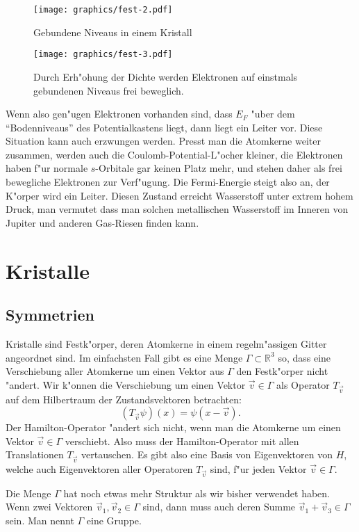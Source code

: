 \begin{figure}
\centering
\texttt{[image: graphics/fest-2.pdf]}
\caption{Gebundene Niveaus in einem Kristall
\label{skript:gebundene-niveaus}}
\end{figure}
\begin{figure}
\centering
\texttt{[image: graphics/fest-3.pdf]}
\caption{Durch Erh"ohung der Dichte werden Elektronen auf einstmals
gebundenen Niveaus frei beweglich.
\label{skript:gebundene-niveaus}}
\end{figure}
Wenn also gen"ugen Elektronen vorhanden sind, dass $E_F$ "uber dem
``Bodenniveaus'' des Potentialkastens liegt, dann liegt ein Leiter vor.
Diese Situation kann auch erzwungen werden.
Presst man die Atomkerne weiter zusammen, werden auch die
Coulomb-Potential-L"ocher kleiner, die Elektronen haben f"ur normale
$s$-Orbitale gar keinen Platz mehr, und stehen daher als frei bewegliche
Elektronen zur Verf"ugung.
Die Fermi-Energie steigt also an, der K"orper wird ein Leiter.
Diesen Zustand erreicht Wasserstoff unter extrem hohem Druck,
man vermutet dass man solchen metallischen Wasserstoff im Inneren
von Jupiter und anderen Gas-Riesen finden kann.

\section{Kristalle}
\subsection{Symmetrien}
Kristalle sind Festk"orper, deren Atomkerne in einem regelm"assigen
Gitter angeordnet sind.
Im einfachsten Fall gibt es eine Menge 
$ \Gamma  \subset \mathbb R^3 $
so, dass eine Verschiebung aller Atomkerne um einen Vektor aus $\Gamma$
den Festk"orper nicht "andert.
Wir k"onnen die Verschiebung um einen Vektor $\vec v\in\Gamma$ als
Operator $T_{\vec v}$ auf dem Hilbertraum der Zustandsvektoren
betrachten:
\[
(T_{\vec v}\psi)(x)=\psi(x-\vec v).
\]
Der Hamilton-Operator "andert sich nicht, wenn man die Atomkerne um
einen Vektor $\vec v\in\Gamma$ verschiebt.
Also muss der Hamilton-Operator mit allen Translationen $T_{\vec v}$ 
vertauschen.
Es gibt also eine Basis von Eigenvektoren von $H$, welche auch
Eigenvektoren aller Operatoren $T_{\vec v}$ sind, f"ur jeden Vektor
$\vec v\in\Gamma$.

Die Menge $\Gamma$ hat noch etwas mehr Struktur als wir bisher
verwendet haben.
Wenn zwei Vektoren $\vec v_1,\vec v_2\in\Gamma$ sind, dann muss
auch deren Summe $\vec v_1+\vec v_3\in\Gamma$ sein.
Man nennt $\Gamma$ eine Gruppe.

